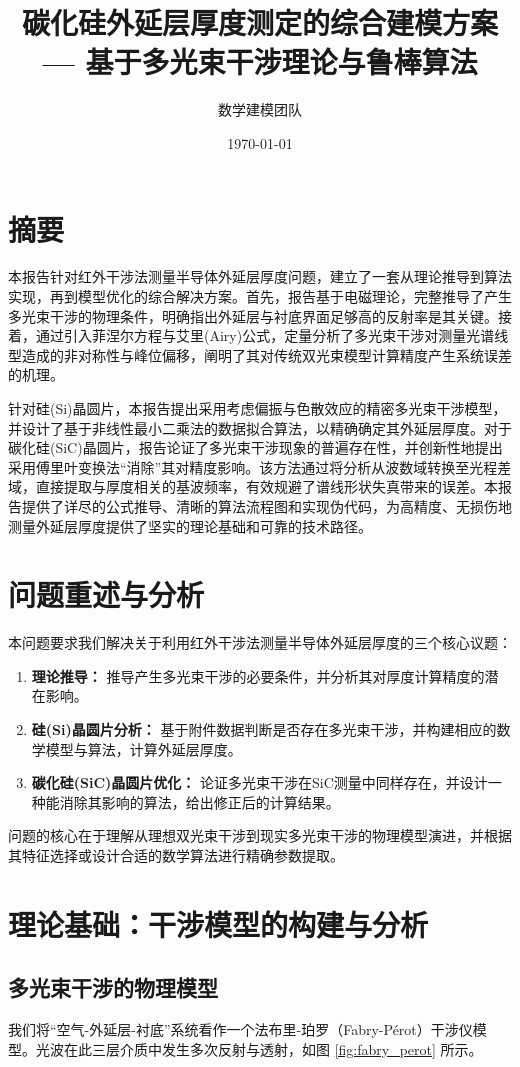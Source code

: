 \documentclass[UTF8, 11pt]{ctexart}
\title{\bf \LARGE 碳化硅外延层厚度测定的综合建模方案 \\ \Large --- 基于多光束干涉理论与鲁棒算法}
\author{数学建模团队}
\date{\today}
\begin{document}
\maketitle
\tableofcontents
\newpage

\section{摘要}
本报告针对红外干涉法测量半导体外延层厚度问题，建立了一套从理论推导到算法实现，再到模型优化的综合解决方案。首先，报告基于电磁理论，完整推导了产生多光束干涉的物理条件，明确指出外延层与衬底界面足够高的反射率是其关键。接着，通过引入菲涅尔方程与艾里(Airy)公式，定量分析了多光束干涉对测量光谱线型造成的非对称性与峰位偏移，阐明了其对传统双光束模型计算精度产生系统误差的机理。

针对硅(Si)晶圆片，本报告提出采用考虑偏振与色散效应的精密多光束干涉模型，并设计了基于非线性最小二乘法的数据拟合算法，以精确确定其外延层厚度。对于碳化硅(SiC)晶圆片，报告论证了多光束干涉现象的普遍存在性，并创新性地提出采用傅里叶变换法“消除”其对精度影响。该方法通过将分析从波数域转换至光程差域，直接提取与厚度相关的基波频率，有效规避了谱线形状失真带来的误差。本报告提供了详尽的公式推导、清晰的算法流程图和实现伪代码，为高精度、无损伤地测量外延层厚度提供了坚实的理论基础和可靠的技术路径。

\section{问题重述与分析}
本问题要求我们解决关于利用红外干涉法测量半导体外延层厚度的三个核心议题：
\begin{enumerate}
    \item \textbf{理论推导：} 推导产生多光束干涉的必要条件，并分析其对厚度计算精度的潜在影响。
    \item \textbf{硅(Si)晶圆片分析：} 基于附件数据判断是否存在多光束干涉，并构建相应的数学模型与算法，计算外延层厚度。
    \item \textbf{碳化硅(SiC)晶圆片优化：} 论证多光束干涉在SiC测量中同样存在，并设计一种能消除其影响的算法，给出修正后的计算结果。
\end{enumerate}
问题的核心在于理解从理想双光束干涉到现实多光束干涉的物理模型演进，并根据其特征选择或设计合适的数学算法进行精确参数提取。

\section{理论基础：干涉模型的构建与分析}

\subsection{多光束干涉的物理模型}
我们将“空气-外延层-衬底”系统看作一个法布里-珀罗（Fabry-Pérot）干涉仪模型。光波在此三层介质中发生多次反射与透射，如图 \ref{fig:fabry_perot} 所示。
\end{document}
